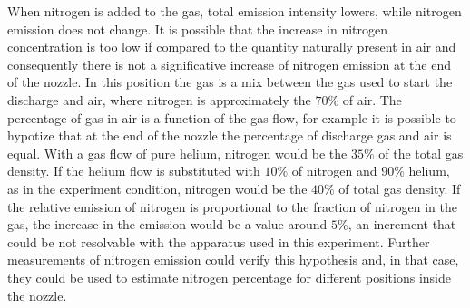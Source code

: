 When nitrogen is added to the gas, total emission intensity lowers, while nitrogen emission does not change. It is possible that the increase in nitrogen concentration is too low if compared to the quantity naturally present in air and consequently there is not a significative increase of nitrogen emission at the end of the nozzle.
In this position the gas is a mix between the gas used to start the discharge and air, where nitrogen is approximately the $70\%$ of air. The percentage of gas in air is a function of the gas flow, for example it is possible to hypotize that at the end of the nozzle the percentage of discharge gas and air is equal. With a gas flow of pure helium, nitrogen would be the $35\%$ of the total gas density. If the helium flow is substituted with $10\%$ of nitrogen and $90\%$ helium, as in the experiment condition, nitrogen would be the $40\%$ of total gas density. If the relative emission of nitrogen is proportional to the fraction of nitrogen in the gas, the increase in the emission would be a value around $5\%$, an increment that could be not resolvable with the apparatus used in this experiment. Further measurements of nitrogen emission could verify this hypothesis and, in that case, they could be used to estimate nitrogen percentage for different positions inside the nozzle. 


